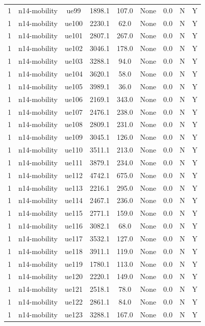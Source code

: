 \begin{table}[ht]
\begin{tabular}{|c|c|c|c|c|c|c|c|c|}
1 & n14-mobility & ue99 & 1898.1 & 107.0 & None & 0.0 & N & Y \\
1 & n14-mobility & ue100 & 2230.1 & 62.0 & None & 0.0 & N & Y \\
1 & n14-mobility & ue101 & 2807.1 & 267.0 & None & 0.0 & N & Y \\
1 & n14-mobility & ue102 & 3046.1 & 178.0 & None & 0.0 & N & Y \\
1 & n14-mobility & ue103 & 3288.1 & 94.0 & None & 0.0 & N & Y \\
1 & n14-mobility & ue104 & 3620.1 & 58.0 & None & 0.0 & N & Y \\
1 & n14-mobility & ue105 & 3989.1 & 36.0 & None & 0.0 & N & Y \\
1 & n14-mobility & ue106 & 2169.1 & 343.0 & None & 0.0 & N & Y \\
1 & n14-mobility & ue107 & 2476.1 & 238.0 & None & 0.0 & N & Y \\
1 & n14-mobility & ue108 & 2809.1 & 231.0 & None & 0.0 & N & Y \\
1 & n14-mobility & ue109 & 3045.1 & 126.0 & None & 0.0 & N & Y \\
1 & n14-mobility & ue110 & 3511.1 & 213.0 & None & 0.0 & N & Y \\
1 & n14-mobility & ue111 & 3879.1 & 234.0 & None & 0.0 & N & Y \\
1 & n14-mobility & ue112 & 4742.1 & 675.0 & None & 0.0 & N & Y \\
1 & n14-mobility & ue113 & 2216.1 & 295.0 & None & 0.0 & N & Y \\
1 & n14-mobility & ue114 & 2467.1 & 236.0 & None & 0.0 & N & Y \\
1 & n14-mobility & ue115 & 2771.1 & 159.0 & None & 0.0 & N & Y \\
1 & n14-mobility & ue116 & 3082.1 & 68.0 & None & 0.0 & N & Y \\
1 & n14-mobility & ue117 & 3532.1 & 127.0 & None & 0.0 & N & Y \\
1 & n14-mobility & ue118 & 3911.1 & 119.0 & None & 0.0 & N & Y \\
1 & n14-mobility & ue119 & 1780.1 & 113.0 & None & 0.0 & N & Y \\
1 & n14-mobility & ue120 & 2220.1 & 149.0 & None & 0.0 & N & Y \\
1 & n14-mobility & ue121 & 2518.1 & 78.0 & None & 0.0 & N & Y \\
1 & n14-mobility & ue122 & 2861.1 & 84.0 & None & 0.0 & N & Y \\
1 & n14-mobility & ue123 & 3288.1 & 167.0 & None & 0.0 & N & Y \\

\end{tabular}
\end{table}
